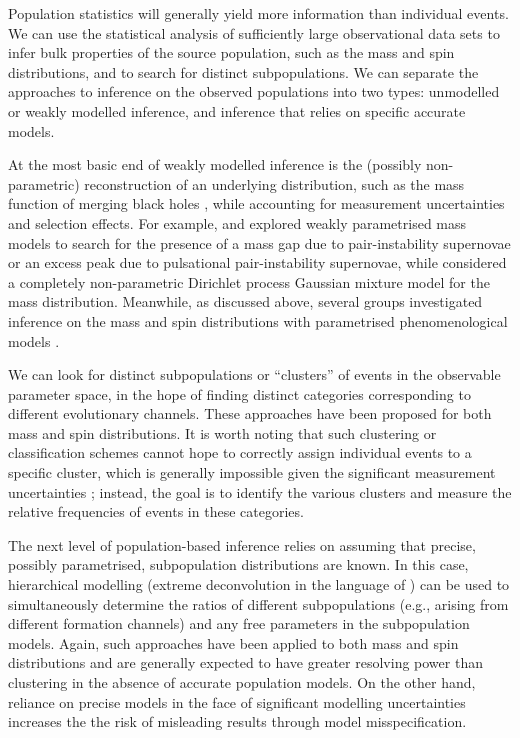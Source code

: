 \documentclass[review]{elsarticle}
\begin{document}
Population statistics will generally yield more information than individual events.  We can use the statistical analysis of sufficiently large observational data sets to infer bulk properties of the source population, such as the mass and spin distributions, and to search for distinct subpopulations.  We can separate the approaches to inference on the observed populations into two types: unmodelled or weakly modelled inference, and inference that relies on specific accurate models. 

At the most basic end of weakly modelled inference is the (possibly non-parametric) reconstruction of an underlying distribution, such as the mass function of merging black holes \citep{BBH:O1,GWTC2:pop,GWTC3:pop}, while accounting for measurement uncertainties and selection effects.  For example, \citet{Fishbach:2017mass} and \citet{Edelman:2021} explored weakly parametrised mass models to search for the presence of a mass gap due to pair-instability supernovae or an excess peak due to pulsational pair-instability supernovae, while \citet{RinaldiDelPozzo:2021} considered a completely non-parametric Dirichlet process Gaussian mixture model for the mass distribution.  Meanwhile, as discussed above, several groups investigated inference on the mass and spin distributions with parametrised phenomenological models \citep[e.g.,][]{TalbotThrane:2017,GWTC2:pop,Callister:2021,Galaudage:2021,Li:2022}.  

We can look for distinct subpopulations or ``clusters'' of events in the observable parameter space, in the hope of finding distinct categories corresponding to different evolutionary channels.  These approaches have been proposed for both mass \citep{Mandel:2015,Mandel:2016cluster} and spin \citep{Farr:2018,Powell:2019} distributions.  It is worth noting that such clustering or classification schemes cannot hope to correctly assign individual events to a specific cluster, which is generally impossible given the significant measurement uncertainties \citep{Littenberg:2015}; instead, the goal is to identify the various clusters and measure the relative frequencies of events in these categories.

The next level of population-based inference relies on assuming that precise, possibly parametrised, subpopulation distributions are known.  In this case, hierarchical modelling (extreme deconvolution in the language of \cite{Hogg:2010}) can be used to simultaneously determine the ratios of different subpopulations (e.g., arising from different formation channels) and any free parameters in the subpopulation models.  Again, such approaches have been applied to both mass \citep[e.g.,][]{Zevin:2017} and spin \citep[e.g.,][]{Vitale:2015,Stevenson:2017spin} distributions and are generally expected to have greater resolving power than clustering in the absence of accurate population models.  On the other hand, reliance on precise models in the face of significant modelling uncertainties \citep[e.g.,][]{Belczynski:2021} increases the  the risk of misleading results through model misspecification.
\end{document}
